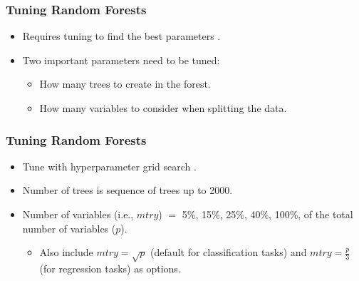 \documentclass[professionalfonts]{beamer}
\begin{document}
\begin{frame}
  \frametitle{Tuning Random Forests}
  \begin{itemize}
    \item Requires tuning to find the best parameters \citep[e.g.,][]{boehmkeHandsOnMachineLearning2019}.
    \item Two important parameters need to be tuned:
    \begin{itemize}
      \item How many trees to create in the forest.
      \item How many variables to consider when splitting the data.
    \end{itemize}
  \end{itemize}
\end{frame}

\begin{frame}
  \frametitle{Tuning Random Forests}
  \begin{itemize}
    \item Tune with hyperparameter grid search \citep{boehmkeHandsOnMachineLearning2019}.
    \item Number of trees is sequence of trees up to 2000.
    \item Number of variables (i.e., $mtry$) $=$ 5\%, 15\%, 25\%, 40\%, 100\%, of the total number of variables ($p$).
    \begin{itemize}
      \item Also include $mtry = \sqrt{p}$ (default for classification tasks) and $mtry = \frac{p}{3}$ (for regression tasks) as options.
    \end{itemize}
  \end{itemize}
\end{frame}
\end{document}
